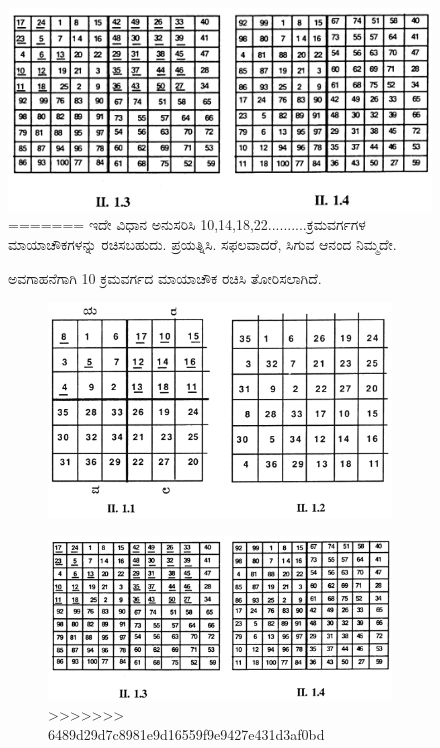 \begin{figure}[H]
\includegraphics{src/figures/chap3/fig3-15.jpg}
=======
ಇದೇ ವಿಧಾನ ಅನುಸರಿಸಿ 10,14,18,22..........ಕ್ರಮವರ್ಗಗಳ ಮಾಯಾಚೌಕ\-ಗಳನ್ನು ರಚಿಸಬಹುದು. ಪ್ರಯತ್ನಿಸಿ. ಸಫಲವಾದರೆ, ಸಿಗುವ ಆನಂದ ನಿಮ್ಮದೇ.

ಅವಗಾಹನೆಗಾಗಿ 10 ಕ್ರಮವರ್ಗದ ಮಾಯಾಚೌಕ ರಚಿಸಿ ತೋರಿಸಲಾಗಿದೆ.
\begin{figure}[h]
\includegraphics[scale=.9]{src/figures/chap3/fig3.14.jpg}
\end{figure}
\begin{figure}[h]
\includegraphics[scale=1.05]{src/figures/chap3/fig3.15.jpg}
>>>>>>> 6489d29d7c8981e9d16559f9e9427e431d3af0bd
\end{figure}


\end{figure}
